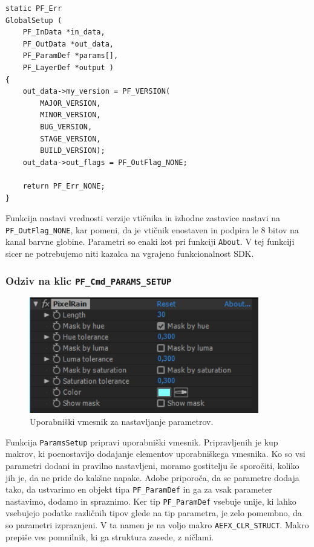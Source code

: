 \documentclass[a4paper, 12pt]{book}
\begin{document}
\begin{verbatim}
static PF_Err 
GlobalSetup (   
    PF_InData *in_data,
    PF_OutData *out_data,
    PF_ParamDef *params[],
    PF_LayerDef *output )
{
    out_data->my_version = PF_VERSION(  
        MAJOR_VERSION, 
        MINOR_VERSION,
        BUG_VERSION, 
        STAGE_VERSION, 
        BUILD_VERSION);
    out_data->out_flags = PF_OutFlag_NONE;
    
    return PF_Err_NONE;
}
\end{verbatim}

Funkcija nastavi vrednosti verzije vtičnika in izhodne zastavice nastavi na \texttt{PF\_OutFlag\_NONE}, kar pomeni, da je vtičnik enostaven in podpira le 8 bitov na kanal barvne globine.
Parametri so enaki kot pri funkciji \texttt{About}.
V tej funkciji sicer ne potrebujemo niti kazalca na vgrajeno funkcionalnost SDK.

\subsubsection{Odziv na klic \texttt{PF\_Cmd\_PARAMS\_SETUP}}

\begin{figure}[t]
\begin{center}
\includegraphics[width=10cm]{img/pixelrainUI.png}
\end{center}
\caption{Uporabniški vmesnik za nastavljanje parametrov.}
\label{ui1}
\end{figure}

Funkcija \texttt{ParamsSetup} pripravi uporabniški vmesnik.
Pripravljenih je kup makrov, ki poenostavijo dodajanje elementov uporabniškega vmesnika.
Ko so vsi parametri dodani in pravilno nastavljeni, moramo gostitelju še sporočiti, koliko jih je, da ne pride do kakšne napake.
Adobe priporoča, da se parametre dodaja tako, da ustvarimo en objekt tipa \texttt{PF\_ParamDef} in ga za vsak parameter nastavimo, dodamo in spraznimo.
Ker tip \texttt{PF\_ParamDef} vsebuje unije, ki lahko vsebujejo podatke različnih tipov glede na tip parametra, je zelo pomembno, da so parametri izpraznjeni.
V ta namen je na voljo makro \texttt{AEFX\_CLR\_STRUCT}.
Makro prepiše ves pomnilnik, ki ga struktura zasede, z ničlami.
\end{document}
